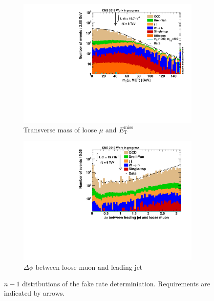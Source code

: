 \begin{figure}[htbp!]
  \ContinuedFloat
  \centering
  \begin{subfigure}[b]{0.495\textwidth}
    \centering
    \includegraphics[width=\textwidth]{plots/nTL_mt.pdf}
    \caption{Transverse mass of loose $\mu$ and $E_{\text{T}}^{\text{miss}}$ \label{fig:ntlmt}}
  \end{subfigure}

  \begin{subfigure}[b]{0.495\textwidth}
    \centering
    \includegraphics[width=\textwidth]{plots/nTL_jetdphi.pdf}
    \caption{$\Delta \phi$ between loose muon and leading jet \label{fig:ntljetdphi}}
  \end{subfigure}

  \caption{$n - 1$ distributions of the fake rate determiniation. Requirements are indicated by arrows.}
  \label{fig:ntl}
\end{figure}

